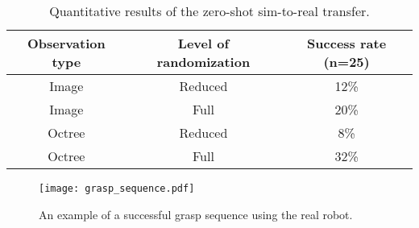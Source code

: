 \begin{table}[ht]
	\vspace{1.379mm}
	\centering
	\caption{Quantitative results of the zero-shot sim-to-real transfer.}
	\label{tab:sim_to_real_success_rate}
	\vspace{-0.25\baselineskip}
	\begin{tabular}{ccc}
		\hline
		\textbf{Observation type} & \textbf{Level of randomization} & \textbf{Success rate} (n=25) \\ \hline
		Image                     & Reduced                         & 12\%                         \\
		Image                     & Full                            & 20\%                         \\
		Octree                    & Reduced                         & {\phantom{0}}8\%             \\
		Octree                    & Full                            & 32\%                         \\ \hline
	\end{tabular}
	\vspace{-0.8\baselineskip}
\end{table}

\begin{figure}[ht]
	\centering
	\texttt{[image: grasp\_sequence.pdf]}
	\caption{An example of a successful grasp sequence using the real robot.}
	\label{fig:grasp-sequence}
	\vspace{-1.0\baselineskip}
\end{figure}
